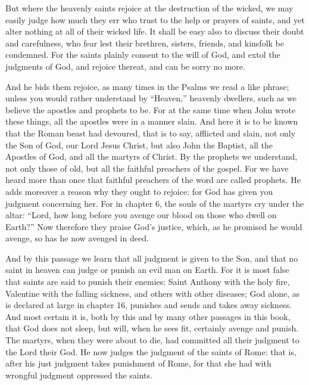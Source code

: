 But where the heavenly saints rejoice at the destruction of the wicked, we may easily judge how much they err who trust to the help or prayers of saints, and yet alter nothing at all of their wicked life. It shall be easy also to discuss their doubt and carefulness, who fear lest their brethren, sisters, friends, and kinsfolk be condemned. For the saints plainly consent to the will of God, and extol the judgments of God, and rejoice thereat, and can be sorry no more.

And he bids them rejoice, as many times in the Psalms we read a like phrase; unless you would rather understand by “Heaven,” heavenly dwellers, such as we believe the apostles and prophets to be. For at the same time when John wrote these things, all the apostles were in a manner slain. And here it is to be known that the Roman beast had devoured, that is to say, afflicted and slain, not only the Son of God, our Lord Jesus Christ, but also John the Baptist, all the Apostles of God, and all the martyrs of Christ. By the prophets we understand, not only those of old, but all the faithful preachers of the gospel. For we have heard more than once that faithful preachers of the word are called prophets. He adds moreover a reason why they ought to rejoice: for God has given you judgment concerning her. For in chapter 6, the souls of the martyrs cry under the altar: “Lord, how long before you avenge our blood on those who dwell on Earth?” Now therefore they praise God’s justice, which, as he promised he would avenge, so has he now avenged in deed.

And by this passage we learn that all judgment is given to the Son, and that no saint in heaven can judge or punish an evil man on Earth. For it is most false that saints are said to punish their enemies: Saint Anthony with the holy fire, Valentine with the falling sickness, and others with other diseases; God alone, as is declared at large in chapter 16, punishes and sends and takes away sickness. And most certain it is, both by this and by many other passages in this book, that God does not sleep, but will, when he sees fit, certainly avenge and punish. The martyrs, when they were about to die, had committed all their judgment to the Lord their God. He now judges the judgment of the saints of Rome: that is, after his just judgment takes punishment of Rome, for that she had with wrongful judgment oppressed the saints.

